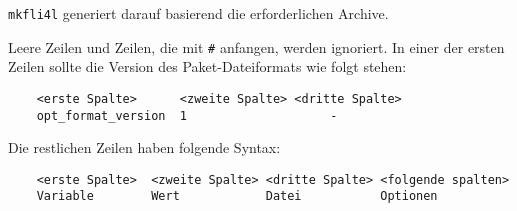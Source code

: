 \texttt{mkfli4l} generiert darauf basierend die erforderlichen Archive.

    Leere Zeilen und Zeilen, die mit \texttt{\#} anfangen, werden
ignoriert. In einer der ersten Zeilen sollte die Version des
Paket-Dateiformats wie folgt stehen:

\begin{example}
\begin{verbatim}
    <erste Spalte>      <zweite Spalte> <dritte Spalte>
    opt_format_version  1                    -
\end{verbatim}
\end{example}

    Die restlichen Zeilen haben folgende Syntax:

\begin{example}
\begin{verbatim}
    <erste Spalte>  <zweite Spalte> <dritte Spalte> <folgende spalten>
    Variable        Wert            Datei           Optionen
\end{verbatim}
\end{example}

